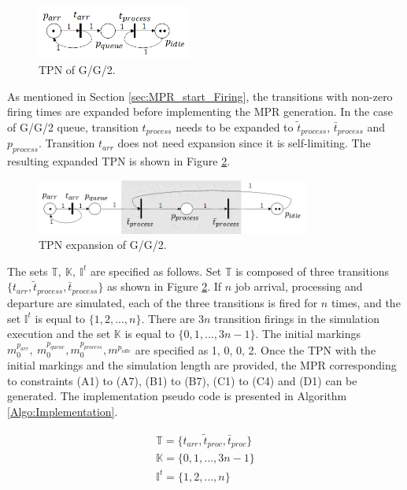\documentclass[suppldata]{interact}
\theoremstyle{plain}
\theoremstyle{definition}
\theoremstyle{remark}
\begin{document}
\begin{figure}[h]
	\centering
	\includegraphics[width=0.45\textwidth]{Figures/TPN-GG2.png}
	\caption{TPN of G/G/2.}
	\label{fig:tpn_GG2}
\end{figure}

As mentioned in Section \ref{sec:MPR_start_Firing}, the transitions with non-zero firing times are expanded before implementing the MPR generation. In the case of G/G/2 queue, transition $t_{process}$ needs to be expanded to $\tilde{t}_{process}$, $\bar{t}_{process}$ and $p_{process}$. Transition $t_{arr}$ does not need expansion since it is self-limiting. The resulting expanded TPN is shown in Figure \ref{fig:tpn_GG2_expansion}.  

\begin{figure}[h]
	\centering
	\includegraphics[width=0.8\textwidth]{Figures/TPN-GG2-expansion.png}
	\caption{TPN expansion of G/G/2.}
	\label{fig:tpn_GG2_expansion}
\end{figure}

The sets $\mathbb{T},\ \mathbb{K},\ \mathbb{I}^t$ are specified as follows. Set $\mathbb{T}$ is composed of three transitions $\{t_{arr},\tilde{t}_{process}, \bar{t}_{process}\}$ as shown in Figure \ref{fig:tpn_GG2_expansion}. If $n$ job arrival, processing and departure are simulated, each of the three transitions is fired for $n$ times, and the set $\mathbb{I}^t$ is equal to $\{1,2,..., n\}$. There are $3n$ transition firings in the simulation execution and the set $\mathbb{K}$ is equal to $\{0,1,..., 3n-1\}$. The initial markings $m^{p_{arr}}_0,\ m^{p_{queue}}_0, m^{p_{process}}_0, m^{p_{idle}}$ are specified as 1, 0, 0, 2. Once the TPN with the initial markings and the simulation length are provided, the MPR %
corresponding to constraints (A1) to (A7), (B1) to (B7), (C1) to (C4) and (D1) can be generated. The implementation pseudo code is presented in Algorithm \ref{Algo:Implementation}. 

\begin{eqnarray}
	\mathbb{T} = \{t_{arr},\tilde{t}_{proc}, \bar{t}_{proc}\} \nonumber\\
	\mathbb{K} = \{0,1,..., 3n-1\} \nonumber\\
	\mathbb{I}^t=\{1,2,..., n\} \nonumber
\end{eqnarray}
\end{document}
